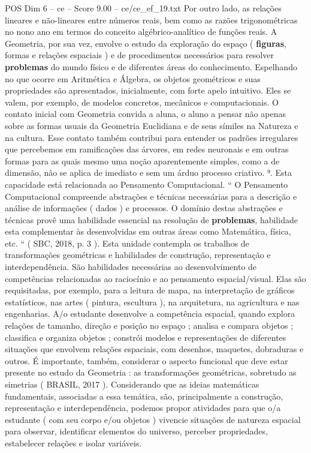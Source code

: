 \begin{textsample}{POS Dim 6 – ce – Score 9.00 – ce/ce\_ef\_19.txt}
Por outro lado, as relações lineares e não-lineares entre números reais, bem como as razões trigonométricas no nono ano em termos do conceito algébrico-analítico de funções reais.
A Geometria, por sua vez, envolve o estudo da exploração do espaço ( \textbf{figuras}, formas e relações espaciais ) e de procedimentos necessários para resolver \textbf{problemas} do mundo físico e de diferentes áreas do conhecimento.
Espelhando no que ocorre em Aritmética e Álgebra, os objetos geométricos e suas propriedades são apresentados, inicialmente, com forte apelo intuitivo.
Eles se valem, por exemplo, de modelos concretos, mecânicos e computacionais.
O contato inicial com Geometria convida a aluna, o aluno a pensar não apenas sobre as formas usuais da Geometria Euclidiana e de seus símiles na Natureza e na cultura.
Esse contato também contribui para entender os padrões irregulares que percebemos em ramificações das árvores, em redes neuronais e em outras formas para as quais mesmo uma noção aparentemente simples, como a de dimensão, não se aplica de imediato e sem um árduo processo criativo. ⁹.
Esta capacidade está relacionada ao Pensamento Computacional. “ O Pensamento Computacional compreende abstrações e técnicas necessárias para a descrição e análise de informações ( dados ) e processos.
O domínio destas abstrações e técnicas provê uma habilidade essencial na resolução de \textbf{problemas}, habilidade esta complementar às desenvolvidas em outras áreas como Matemática, física, etc. “ ( SBC, 2018, p. 3 ).
Esta unidade contempla os trabalhos de transformações geométricas e habilidades de construção, representação e interdependência.
São habilidades necessárias ao desenvolvimento de competências relacionadas ao raciocínio e ao pensamento espacial/visual.
Elas são requisitadas, por exemplo, para a leitura de mapa, na interpretação de gráficos estatísticos, nas artes ( pintura, escultura ), na arquitetura, na agricultura e nas engenharias.
A/o estudante desenvolve a competência espacial, quando explora relações de tamanho, direção e posição no espaço ; analisa e compara objetos ; classifica e organiza objetos ; constrói modelos e representações de diferentes situações que envolvem relações espaciais, com desenhos, maquetes, dobraduras e outros.
É importante, também, considerar o aspecto funcional que deve estar presente no estudo da Geometria : as transformações geométricas, sobretudo as simetrias ( BRASIL, 2017 ).
Considerando que as ideias matemáticas fundamentais, associadas a essa temática, são, principalmente a construção, representação e interdependência, podemos propor atividades para que o/a estudante ( com seu corpo e/ou objetos ) vivencie situações de natureza espacial para observar, identificar elementos do universo, perceber propriedades, estabelecer relações e isolar variáveis.

\end{textsample}
